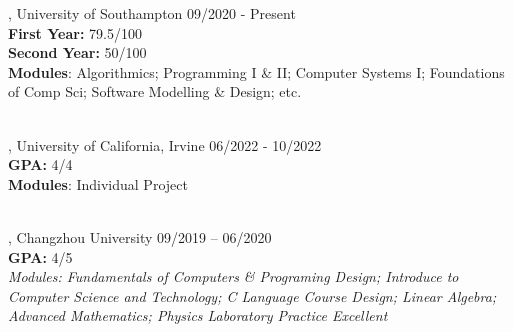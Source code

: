 
, University of Southampton	\hfill 09/2020 - Present
\\ \textbf{First Year:} 79.5/100 
\\ \textbf{Second Year:} 50/100
\\ \textbf{Modules}: Algorithmics; Programming I \& II; Computer Systems I; Foundations of Comp Sci; Software Modelling \& Design; etc.\\~

, University of California, Irvine  \hfill 06/2022 - 10/2022
\\ \textbf{GPA:} 4/4
\\ \textbf{Modules}: Individual Project\\~

, Changzhou University \hfill	09/2019 – 06/2020
\\ \textbf{GPA:} 4/5
\\ \textit{Modules: Fundamentals of Computers \& Programing Design; Introduce to Computer Science and Technology; C Language Course Design; Linear Algebra; Advanced Mathematics; Physics Laboratory Practice Excellent}



